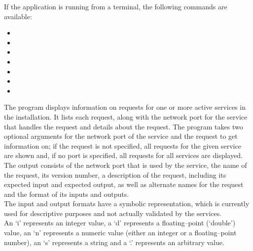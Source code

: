 If the application is running from a terminal, the following commands are available:
\begin{itemize}
\item {}
\item {}
\item {}
\item {}
\item {}
\item {}
\item {}
\end{itemize}
The program  displays information on requests for one or more
active services in the \mplusm{} installation.
It lists each request, along with the \yarp{} network port for the service that handles
the request and details about the request.
The program takes two optional arguments for the \yarp{} network port of the service and
the request to get information on; if the request is not specified, all requests for the
given service are shown and, if no port is specified, all requests for all services are
displayed.\\

The output consists of the \yarp{} network port that is used by the service, the name of
the request, its version number, a description of the request, including its expected
input and expected output, as well as alternate names for the request and the format of
its inputs and outputs.\\

The input and output formats have a symbolic representation, which is currently used for
descriptive purposes and not actually validated by the services.\\

An `i' represents an integer value, a `d' represents a floating--point (`double') value,
an `n' represents a numeric value (either an integer or a floating--point number), an `s'
represents a string and a `.' represents an arbitrary value.\\

